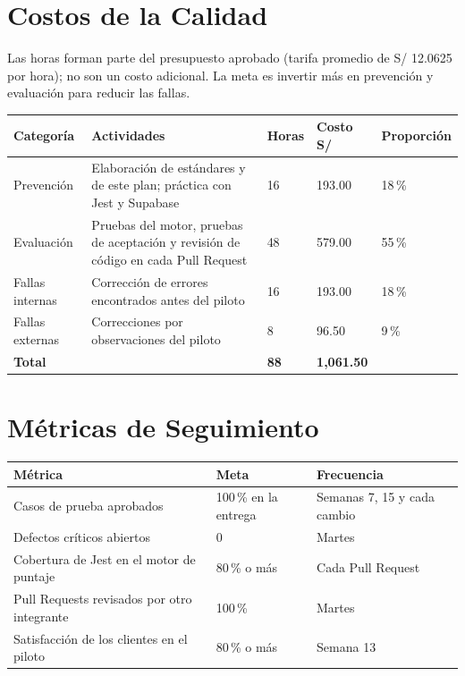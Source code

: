 \documentclass[11pt,a4paper]{article}
\begin{document}
\section{Costos de la Calidad}
Las horas forman parte del presupuesto aprobado (tarifa promedio de S/ 12.0625 por hora); no son un costo adicional. La meta es invertir más en prevención y evaluación para reducir las fallas.

\vspace{0.1cm}
{\small
{}
\noindent\begin{tabularx}{\textwidth}{@{}P{2.6cm} L Q{1.1cm} Q{1.8cm} P{3.2cm}@{}}
\toprule
{}
\textbf{Categoría} & \textbf{Actividades} & \textbf{Horas} & \textbf{Costo S/} & \textbf{Proporción} \\
\midrule
Prevención & Elaboración de estándares y de este plan; práctica con Jest y Supabase & 16 & 193.00 &  18\,\% \\
Evaluación & Pruebas del motor, pruebas de aceptación y revisión de código en cada Pull Request & 48 & 579.00 &  55\,\% \\
Fallas internas & Corrección de errores encontrados antes del piloto & 16 & 193.00 &  18\,\% \\
Fallas externas & Correcciones por observaciones del piloto & 8 & 96.50 &  9\,\% \\
\midrule
{}\textbf{Total} & & \textbf{88} & \textbf{1,061.50} & \\
\bottomrule
\end{tabularx}
}

\section{Métricas de Seguimiento}
{\small
{}
\noindent\begin{tabularx}{\textwidth}{@{}L C{2.4cm} P{2.8cm}@{}}
\toprule
{}
\textbf{Métrica} & \textbf{Meta} & \textbf{Frecuencia} \\
\midrule
Casos de prueba aprobados & 100\,\% en la entrega & Semanas 7, 15 y cada cambio \\
Defectos críticos abiertos & 0 & Martes \\
Cobertura de Jest en el motor de puntaje & 80\,\% o más & Cada Pull Request \\
Pull Requests revisados por otro integrante & 100\,\% & Martes \\
Satisfacción de los clientes en el piloto & 80\,\% o más & Semana 13 \\
\bottomrule
\end{tabularx}
}
\end{document}
